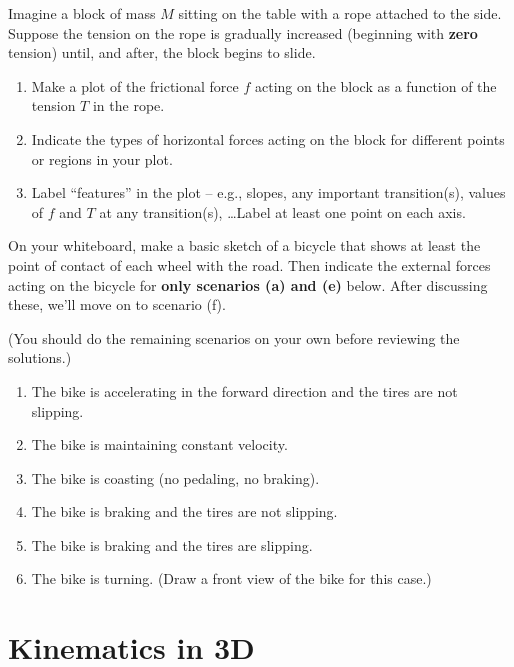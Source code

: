 \documentclass[11pt, letterpaper, openany]{book}
\newenvironment{exercise}[1][Exercise]{%
  \tcolorbox[blanker, breakable, left=1em,
    before skip=1em, after skip=1em,
    borderline west={3pt}{0pt}{PhysNavy},
    colback=PhysCream,
    before upper={\textcolor{PhysNavy}{\sffamily\bfseries #1:}\space}
  ]%
}{%
  \endtcolorbox%
}
\begin{document}
\begin{exercise}[Exercise 2]
Imagine a block of mass $M$ sitting on the table with a rope attached to the side. Suppose the tension on the rope is gradually increased (beginning with \textbf{zero} tension) until, and after, the block begins to slide.
\begin{enumerate}[label=(\alph*)]
    \item Make a plot of the frictional force $f$ acting on the block as a function of the tension $T$ in the rope.
    \item Indicate the types of horizontal forces acting on the block for different points or regions in your plot.
    \item Label ``features'' in the plot -- e.g., slopes, any important transition(s), values of $f$ and $T$ at any transition(s), \dots Label at least one point on each axis.
\end{enumerate}
\end{exercise}

\begin{exercise}[Exercise 3]
On your whiteboard, make a basic sketch of a bicycle that shows at least the point of contact of each wheel with the road. Then indicate the external forces acting on the bicycle for \textbf{only scenarios (a) and (e)} below. After discussing these, we'll move on to scenario (f).

(You should do the remaining scenarios on your own before reviewing the solutions.)
\begin{enumerate}[label=(\alph*)]
    \item The bike is accelerating in the forward direction and the tires are not slipping.
    \item The bike is maintaining constant velocity.
    \item The bike is coasting (no pedaling, no braking).
    \item The bike is braking and the tires are not slipping.
    \item The bike is braking and the tires are slipping.
    \item The bike is turning. (Draw a front view of the bike for this case.)
\end{enumerate}
\end{exercise}

\section{Kinematics in 3D}
\end{document}
